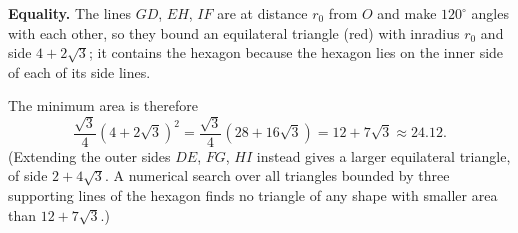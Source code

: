 \textbf{Equality.} The lines $GD$, $EH$, $IF$ are at distance $r_0$ from $O$ and make $120^\circ$ angles with each other, so they bound an equilateral triangle (red) with inradius $r_0$ and side $4+2\sqrt3$; it contains the hexagon because the hexagon lies on the inner side of each of its side lines.

The minimum area is therefore
\[
\dfrac{\sqrt3}{4}\left(4+2\sqrt3\right)^2=\dfrac{\sqrt3}{4}\left(28+16\sqrt3\right)=\boxed{12+7\sqrt3}\approx24.12 .
\]
(Extending the outer sides $DE$, $FG$, $HI$ instead gives a larger equilateral triangle, of side $2+4\sqrt3$. A numerical search over all triangles bounded by three supporting lines of the hexagon finds no triangle of any shape with smaller area than $12+7\sqrt3$.)
